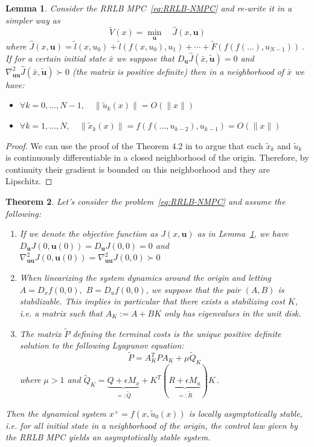 \documentclass[conference]{IEEEtran}
\newtheorem{theorem}{Theorem}[section]
\newtheorem{lemma}[theorem]{Lemma}
\theoremstyle{definition}
\theoremstyle{remark}
\def\bf#1{\mathbf{#1}}
\begin{document}
\begin{lemma}\label{thm:Lipschitzianity}
	Consider the RRLB MPC~\ref{eq:RRLB-NMPC} and re-write it in a simpler way as
	$$\tilde{V}(x)=\underset{\bf{u}}{\min} \quad \hat{J}(x,\bf{u})$$
	where $\hat{J}(x,\bf{u})=\tilde{l}(x,u_0)+\tilde{l}(f(x,u_0),u_1)+\cdots+\tilde{F}(f(f(...),u_{N-1}))$\,.
	If for a certain initial state $\bar{x}$ we suppose that $D_\bf{u}\hat{J}(\bar{x},\tilde{\bf{u}})=0$ and $\nabla_{\bf{u}\bf{u}}^2\hat{J}(\bar{x}, \tilde{\bf{u}})\succ 0$ (the matrix is positive definite) then in a neighborhood of $\bar{x}$ we have:
	\begin{itemize}[label=\textbullet]
		\item $\forall k=0,\ldots,N-1,\quad \|\tilde{u}_k(x)\|=O(\|x\|)$
		\item $\forall k=1,\ldots,N,\quad \|\tilde{x}_k(x)\|=f(f(\ldots,u_{k-2}),u_{k-1})=O(\|x\|)$
	\end{itemize}
\end{lemma}
\begin{proof}
	We can use the proof of the Theorem 4.2 in \cite{lectures-parametric-optimization} to argue that each $\tilde{x}_k$ and $\tilde{u}_k$ is continuously differentiable in a closed neighborhood of the origin.
	Therefore, by continuity their gradient is bounded on this neighborhood and they are Lipschitz.
\end{proof}

\begin{theorem}\label{thm:nominal-stability}
	Let's consider the problem~\ref{eq:RRLB-NMPC} and assume the following:
	\begin{enumerate}
		\item If we denote the objective function as $J(x,\bf{u})$ as in Lemma~\ref{thm:Lipschitzianity}, we have $D_\bf{u}J(0,\bf{u}(0))=D_\bf{u}J(0,0)=0$ and $\nabla^2_{\bf{u}\bf{u}}J(0,\bf{u}(0))=\nabla^2_{\bf{u}\bf{u}}J(0,0)\succ 0$

		\item When linearizing the system dynamics around the origin and letting $A=D_xf(0,0),$ $B=D_uf(0,0)$, we suppose that the pair $(A,B)$ is stabilizable.
		This implies in particular that there exists a stabilizing cost $K$, i.e. a matrix such that $A_K:=A+BK$ only has eigenvalues in the unit disk.

		\item The matrix $\tilde{P}$ defining the terminal costs is the unique positive definite solution to the following Lyapunov equation:
		\begin{equation}
			\label{eq:Lyapunov}
			\tilde{P}=A_K^TPA_K+\mu \tilde{Q}_K
		\end{equation}
		where $\mu>1$ and $\tilde{Q}_K=\underbrace{Q+\epsilon M_x}_{=:\tilde{Q}}+K^T(\underbrace{R+\epsilon M_u}_{=:\tilde{R}})K$\,.
	\end{enumerate}
	Then the dynamical system $x^+=f(x,\tilde{u}_0(x))$ is locally asymptotically stable, i.e. for all initial state in a neighborhood of the origin, the control law given by the RRLB MPC yields an asymptotically stable system.
\end{theorem}
\end{document}
